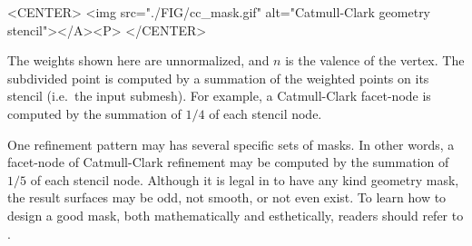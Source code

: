 \begin{ccHtmlOnly}
  <CENTER>
     <img src="./FIG/cc_mask.gif" alt="Catmull-Clark geometry stencil"></A><P>
  </CENTER>
\end{ccHtmlOnly}

The weights shown here are unnormalized, and $n$ is the valence 
of the vertex. The subdivided point is computed by a summation
of the weighted points on its stencil (i.e.~the input submesh).
For example, a Catmull-Clark facet-node is computed by the summation
of $1/4$ of each stencil node.

One refinement pattern may has several specific sets of masks. In other 
words, a facet-node of Catmull-Clark refinement may be computed by 
the summation of $1/5$ of each stencil node. Although it is legal in 
 to have any kind geometry mask,
the result surfaces may be odd, not smooth, or not even exist.
To learn how to design a good mask, both mathematically and esthetically, 
readers should refer to \cite{cgal:ww-smgd-02}.






